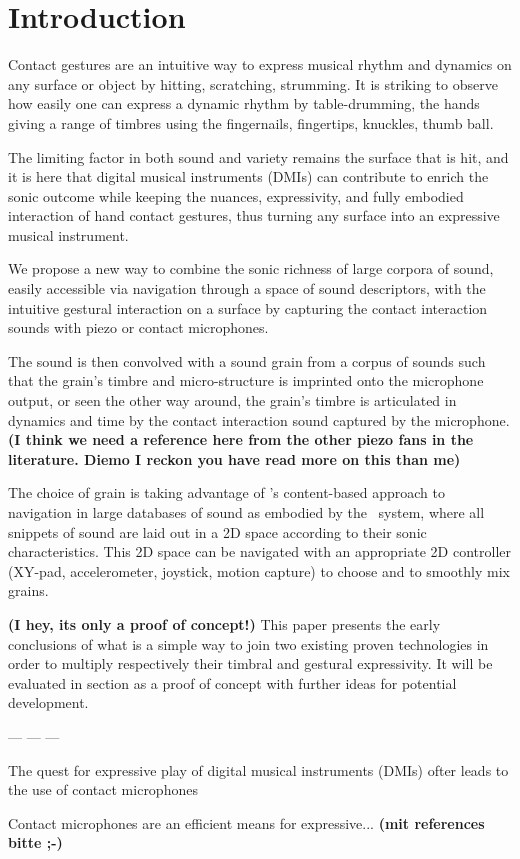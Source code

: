 \section{Introduction}


Contact gestures are an intuitive way to express musical rhythm and dynamics on any surface or object by hitting, scratching, strumming.  It is striking to observe how easily one can express a dynamic rhythm by table-drumming, the hands giving a range of timbres using the fingernails, fingertips, knuckles, thumb ball.


The limiting factor in both sound and variety remains the surface that is hit, and it is here that digital musical instruments (DMIs) can contribute to enrich the sonic outcome while keeping the nuances, expressivity, and fully embodied interaction of hand contact gestures, thus turning any surface into an expressive musical instrument.


We propose a new way to combine the sonic richness of large corpora of sound, easily accessible via navigation through a space of sound descriptors, with the intuitive gestural interaction on a surface by capturing the contact interaction sounds with piezo or contact microphones.


The sound is then convolved with a sound grain from a corpus of sounds such that the grain's timbre and micro-structure is imprinted onto the microphone output, or seen the other way around, the grain's timbre is articulated in dynamics and time by the contact interaction sound captured by the microphone. \textbf{(I think we need a reference here from the other piezo fans in the literature. Diemo I reckon you have read more on this than me)}


The choice of grain is taking advantage of \cbcs's content-based approach to navigation in large databases of sound as embodied by the \catart\ system, where all snippets of sound are laid out in a 2D space according to their sonic characteristics.  This 2D space can be navigated with an appropriate 2D controller (XY-pad, accelerometer, joystick, motion capture) to choose and to smoothly mix grains.

\textbf{(I hey, its only a proof of concept!)} This paper presents the early conclusions of what is a simple way to join two existing proven technologies in order to multiply respectively their timbral and gestural expressivity. It will be evaluated in section as a proof of concept with further ideas for potential development.

--- --- ---


The quest for expressive play of digital musical instruments (DMIs) ofter leads to the use of contact microphones


Contact microphones are an efficient means for expressive... \textbf{(mit references bitte ;-)}
